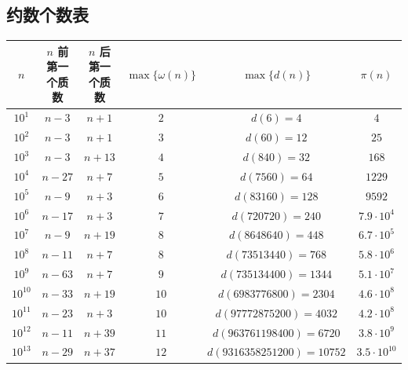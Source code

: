 \documentclass[12pt]{ctexart}
\begin{document}
\subsection{约数个数表}
\begin{table}[H]
	\centering
	\hspace*{-0.5cm}
	\begin{tabular}{|c|c|c|c|c|c|}
		\toprule
		$n$       & $n$ 前第一个质数 & $n$ 后第一个质数 & $\max\{\omega(n)\}$ & $\max\{d(n)\}$                    & $\pi(n)$           \\
		\midrule
		$10^{1}$  & $n-3$      & $n+1$      & $2$                 & $d(6) = 4$                        & $4$                \\\midrule
		$10^{2}$  & $n-3$      & $n+1$      & $3$                 & $d(60) = 12$                      & $25$               \\\midrule
		$10^{3}$  & $n-3$      & $n+13$     & $4$                 & $d(840) = 32$                     & $168$              \\\midrule
		$10^{4}$  & $n-27$     & $n+7$      & $5$                 & $d(7560) = 64$                    & $1229$             \\\midrule
		$10^{5}$  & $n-9$      & $n+3$      & $6$                 & $d(83160) = 128$                  & $9592$             \\\midrule
		$10^{6}$  & $n-17$     & $n+3$      & $7$                 & $d(720720) = 240$                 & $7.9\cdot 10^4$    \\\midrule
		$10^{7}$  & $n-9$      & $n+19$     & $8$                 & $d(8648640) = 448$                & $6.7\cdot 10^5$    \\\midrule
		$10^{8}$  & $n-11$     & $n+7$      & $8$                 & $d(73513440) = 768$               & $5.8\cdot 10^6$    \\\midrule
		$10^{9}$  & $n-63$     & $n+7$      & $9$                 & $d(735134400) = 1344$             & $5.1\cdot 10^7$    \\\midrule
		$10^{10}$ & $n-33$     & $n+19$     & $10$                & $d(6983776800) = 2304$            & $4.6\cdot 10^8$    \\\midrule
		$10^{11}$ & $n-23$     & $n+3$      & $10$                & $d(97772875200) = 4032$           & $4.2\cdot 10^8$    \\\midrule
		$10^{12}$ & $n-11$     & $n+39$     & $11$                & $d(963761198400) = 6720$          & $3.8\cdot 10^9$    \\\midrule
		$10^{13}$ & $n-29$     & $n+37$     & $12$                & $d(9316358251200) = 10752$        & $3.5\cdot 10^{10}$ \\\midrule

\end{tabular}
\end{table}
\end{document}

